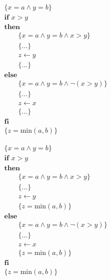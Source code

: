 \begin{frame}
  \begin{minipage}{\textwidth}
    \begin{align*}
      &\{x=a \land y=b\}\\
      &\textbf{if } x > y\\
      &\textbf{then}\\
      & \qquad \{x=a \land y=b \land x>y\}\\
      & \qquad \{...\}\\
      & \qquad z \leftarrow y\\
      & \qquad \{...\}\\
      &\textbf{else}\\
      & \qquad \{x=a \land y=b \land \lnot(x>y)\}\\
      & \qquad \{...\}\\
      & \qquad z \leftarrow x\\
      & \qquad \{...\}\\
      &\textbf{fi}\\
      &\{z=\text{min}(a,b)\}
    \end{align*}
  \end{minipage}
\end{frame}

\begin{frame}
  \begin{minipage}{\textwidth}
    \begin{align*}
      &\{x=a \land y=b\}\\
      &\textbf{if } x > y\\
      &\textbf{then}\\
      & \qquad \{x=a \land y=b \land x>y\}\\
      & \qquad \{...\}\\
      & \qquad z \leftarrow y\\
      & \qquad \{z=\text{min}(a,b)\}\\
      &\textbf{else}\\
      & \qquad \{x=a \land y=b \land \lnot(x>y)\}\\
      & \qquad \{...\}\\
      & \qquad z \leftarrow x\\
      & \qquad \{z=\text{min}(a,b)\}\\
      &\textbf{fi}\\
      &\{z=\text{min}(a,b)\}
    \end{align*}
  \end{minipage}
\end{frame}

